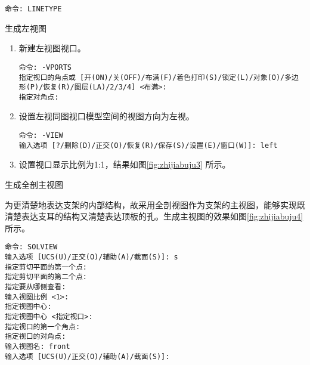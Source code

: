 \begin{procedure}
\begin{lstlisting}
命令: LINETYPE
\end{lstlisting}

\item 生成左视图

\begin{enumerate}
\item 新建左视图视口。

\begin{lstlisting}
命令: -VPORTS
指定视口的角点或 [开(ON)/关(OFF)/布满(F)/着色打印(S)/锁定(L)/对象(O)/多边形(P)/恢复(R)/图层(LA)/2/3/4] <布满>:
指定对角点:
\end{lstlisting}

\item 设置左视同图视口模型空间的视图方向为左视。
\begin{lstlisting}
命令: -VIEW
输入选项 [?/删除(D)/正交(O)/恢复(R)/保存(S)/设置(E)/窗口(W)]: left
\end{lstlisting}

\item 设置视口显示比例为1:1，结果如图\ref{fig:zhijiabuju3} 所示。

\end{enumerate}

\begin{figure}[htbp]
\centering
\begin{floatrow}[3]
\end{floatrow}
\end{figure}

\item 生成全剖主视图

为更清楚地表达支架的内部结构，故采用全剖视图作为支架的主视图，能够实现既清楚表达支耳的结构又清楚表达顶板的孔。生成主视图的效果如图\ref{fig:zhijiabuju4}所示。

\begin{lstlisting}
命令: SOLVIEW
输入选项 [UCS(U)/正交(O)/辅助(A)/截面(S)]: s
指定剪切平面的第一个点:
指定剪切平面的第二个点:
指定要从哪侧查看:
输入视图比例 <1>:
指定视图中心:
指定视图中心 <指定视口>:
指定视口的第一个角点: 
指定视口的对角点:
输入视图名: front
输入选项 [UCS(U)/正交(O)/辅助(A)/截面(S)]:
\end{lstlisting}



\end{procedure}
